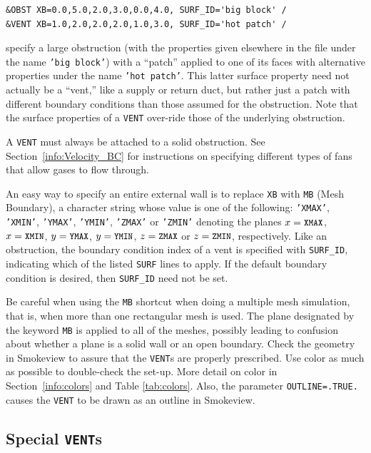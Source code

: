 \documentclass[11pt]{book}
\newcommand{\ct}{\tt\small}
\begin{document}
\footnotesize
\begin{verbatim}
&OBST XB=0.0,5.0,2.0,3.0,0.0,4.0, SURF_ID='big block' /
&VENT XB=1.0,2.0,2.0,2.0,1.0,3.0, SURF_ID='hot patch' /
\end{verbatim} \normalsize

\noindent
specify a large obstruction (with the properties given elsewhere in the file under the name {\ct 'big block'}) with
a ``patch'' applied to one of its faces with alternative properties under the name {\ct 'hot patch'}. This latter
surface property need not actually be a ``vent,'' like a supply or return duct, but rather just a patch with different boundary
conditions than those assumed for the obstruction. Note that the surface properties of a {\ct VENT} over-ride those of the
underlying obstruction.

\begin{warning}
A {\ct VENT} must always be attached to a solid obstruction. See
Section~\ref{info:Velocity_BC} for instructions on specifying different types of fans that allow gases to flow through.
\end{warning}

\noindent
An easy way to specify an entire external wall is to replace {\ct XB} with
{\ct MB} (Mesh Boundary), a character string whose value is one of the following:
{\ct 'XMAX'}, {\ct 'XMIN'}, {\ct 'YMAX'}, {\ct 'YMIN'}, {\ct 'ZMAX'} or
{\ct 'ZMIN'} denoting the planes $x=\hbox{\ct XMAX}$, $x=\hbox{\ct XMIN}$,
$y=\hbox{\ct YMAX}$, $y=\hbox{\ct YMIN}$, $z=\hbox{\ct ZMAX}$
or $z=\hbox{\ct ZMIN}$, respectively.
Like an obstruction, the boundary condition index of a vent is specified
with {\ct SURF\_ID}, indicating which of the listed {\ct SURF} lines to
apply. If the default boundary condition is desired, then {\ct SURF\_ID} need not be set.

Be careful when using the {\ct MB} shortcut when doing a multiple mesh
simulation, that is, when more than one rectangular mesh is used. The
plane designated by the keyword {\ct MB} is applied to all of the
meshes, possibly leading to confusion about whether a plane is a solid
wall or an open boundary. Check the geometry in Smokeview to assure that
the {\ct VENT}s are properly prescribed. Use color as much as
possible to double-check the set-up.  More detail on color in
Section~\ref{info:colors} and Table \ref{tab:colors}. Also, the parameter {\ct OUTLINE=.TRUE.} causes the
{\ct VENT} to be drawn as an outline in Smokeview.


\subsection{Special \texorpdfstring{{\tt VENT}s}{VENTs}}
\end{document}
